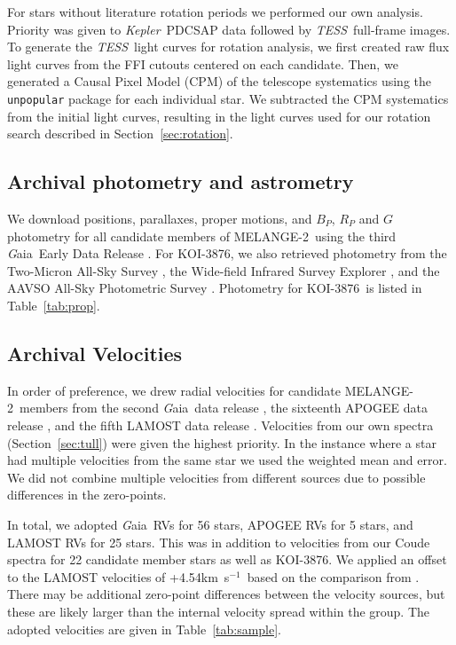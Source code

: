 \documentclass[twocolumn]{aastex631}
\newcommand{\starname}{KOI-3876}
\newcommand{\kepler}{{\it Kepler}}
\newcommand\kms{km~s$^{-1}$}
\newcommand{\tess}{\textit{TESS}}
\newcommand{\gaia}{{\textit Gaia}}
\newcommand{\association}{MELANGE-2}
\begin{document}
For stars without literature rotation periods we performed our own analysis. Priority was given to \kepler\ PDCSAP data followed by \tess\ full-frame images. To generate the \tess\ light curves for rotation analysis, we first created raw flux light curves from the FFI cutouts centered on each candidate. Then, we generated a Causal Pixel Model (CPM) of the telescope systematics using the \texttt{unpopular} package \citep{2021arXiv210615063H} for each individual star. We subtracted the CPM systematics from the initial light curves, resulting in the light curves used for our rotation search described in Section~\ref{sec:rotation}.

\subsection{Archival photometry and astrometry}
We download positions, parallaxes, proper motions, and $B_P$, $R_P$ and $G$ photometry for all candidate members of \association\ using the third \gaia\ Early Data Release \citep[EDR3;][]{GaiaEDR3}. For \starname, we also retrieved photometry from the Two-Micron All-Sky Survey \citep[2MASS;][]{Skrutskie2006}, the Wide-field Infrared Survey Explorer \citep[WISE; ][]{allwise}, and the AAVSO All-Sky Photometric Survey \citep[APASS; ][]{apass}. Photometry for \starname\ is listed in Table~\ref{tab:prop}. 


\subsection{Archival Velocities}
In order of preference, we drew radial velocities for candidate \association\ members from the second \gaia\ data release \citep[DR2;][]{DR2_velocities}, the sixteenth APOGEE data release \citep[DR16; ][]{2020AJ....160..120J}, and the fifth LAMOST data release \cite[DR5; ][]{2015RAA....15.1095L, 2019yCat.5164....0L}. Velocities from our own spectra (Section~\ref{sec:tull}) were given the highest priority. In the instance where a star had multiple velocities from the same star we used the weighted mean and error. We did not combine multiple velocities from different sources due to possible differences in the zero-points. 


In total, we adopted \gaia\ RVs for 56 stars, APOGEE RVs for 5 stars, and LAMOST RVs for 25 stars. This was in addition to velocities from our Coude spectra for 22 candidate member stars as well as \starname. We applied an offset to the LAMOST velocities of +4.54\kms\ based on the comparison from \citet{2018A&A...620A..76A}. There may be additional zero-point differences between the velocity sources, but these are likely larger than the internal velocity spread within the group. The adopted velocities are given in Table~\ref{tab:sample}.
\end{document}
